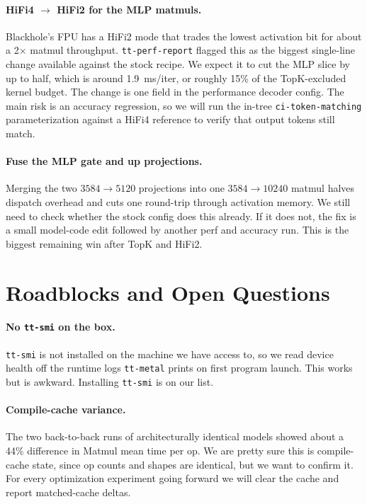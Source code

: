 \documentclass[sigplan,nonacm,review]{acmart}
\begin{document}
\paragraph{HiFi4 $\to$ HiFi2 for the MLP matmuls.} Blackhole's FPU has a
HiFi2 mode that trades the lowest activation bit for about a
2$\times$ matmul throughput. \texttt{tt-perf-report} flagged this as the
biggest single-line change available against the stock recipe. We
expect it to cut the MLP slice by up to half, which is around
1.9~ms/iter, or roughly 15\% of the TopK-excluded kernel budget. The
change is one field in the performance decoder config. The main risk
is an accuracy regression, so we will run the in-tree
\texttt{ci-token-matching} parameterization against a HiFi4 reference
to verify that output tokens still match.

\paragraph{Fuse the MLP gate and up projections.} Merging the two
$3584 \!\to\! 5120$ projections into one $3584 \!\to\! 10240$ matmul
halves dispatch overhead and cuts one round-trip through activation
memory. We still need to check whether the stock config does this
already. If it does not, the fix is a small model-code edit followed by
another perf and accuracy run. This is the biggest remaining win after
TopK and HiFi2.

\section{Roadblocks and Open Questions}

\paragraph{No \texttt{tt-smi} on the box.} \texttt{tt-smi} is not
installed on the machine we have access to, so we read device health
off the runtime logs \texttt{tt-metal} prints on first program launch.
This works but is awkward. Installing \texttt{tt-smi} is on our list.

\paragraph{Compile-cache variance.} The two back-to-back runs of
architecturally identical models showed about a 44\% difference in
Matmul mean time per op. We are pretty sure this is compile-cache
state, since op counts and shapes are identical, but we want to confirm
it. For every optimization experiment going forward we will clear the
cache and report matched-cache deltas.
\end{document}
